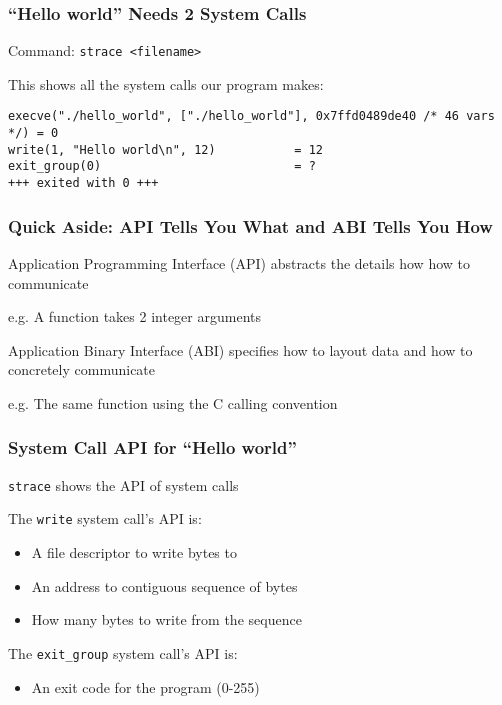   \begin{frame}[fragile]
    \frametitle{``Hello world'' Needs 2 System Calls}

    Command: \hspace{0.5em} \texttt{strace <filename>}

    \vspace{2em}
    
    This shows all the system calls our program makes:

    \vspace{2em}

    \begin{lstlisting}[basicstyle=\scriptsize\ttfamily]
execve("./hello_world", ["./hello_world"], 0x7ffd0489de40 /* 46 vars */) = 0
write(1, "Hello world\n", 12)           = 12
exit_group(0)                           = ?
+++ exited with 0 +++
    \end{lstlisting}
  \end{frame}

  \begin{frame}
    \frametitle{Quick Aside: API Tells You What and ABI Tells You How} 

    Application Programming Interface (API) abstracts the details how how to
    communicate

    \vspace{2em}

    \hspace{2em} e.g. A function takes 2 integer arguments

    \vspace{4em}

    Application Binary Interface (ABI) specifies how to layout data and how to
    concretely communicate

    \vspace{2em}

    \hspace{2em} e.g. The same function using the C calling convention
  \end{frame}

  \begin{frame}
    \frametitle{System Call API for ``Hello world''}

    \texttt{strace} shows the API of system calls

    \vspace{2em}

    The \texttt{write} system call's API is:
    \begin{itemize}
      \item A file descriptor to write bytes to
      \item An address to contiguous sequence of bytes
      \item How many bytes to write from the sequence
    \end{itemize}
    
    \vspace{2em}

    The \texttt{exit\_group} system call's API is:
    \begin{itemize}
      \item An exit code for the program (0-255)
    \end{itemize}
  \end{frame}

